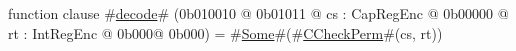 function clause #\hyperref[sailMIPSzdecode]{decode}# (0b010010 @ 0b01011 @ cs : CapRegEnc @ 0b00000 @ rt : IntRegEnc @ 0b000@ 0b000) = #\hyperref[sailMIPSzSome]{Some}#(#\hyperref[sailMIPSzCCheckPerm]{CCheckPerm}#(cs, rt))
